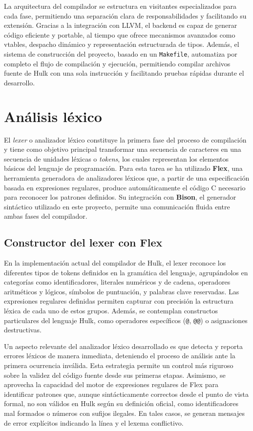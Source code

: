 \documentclass{llncs}
\begin{document}
	La arquitectura del compilador se estructura en visitantes especializados para cada fase, permitiendo una separación clara de responsabilidades y facilitando su extensión. Gracias a la integración con LLVM, el backend es capaz de generar código eficiente y portable, al tiempo que ofrece mecanismos avanzados como vtables, despacho dinámico y representación estructurada de tipos. Además, el sistema de construcción del proyecto, basado en un \texttt{Makefile}, automatiza por completo el flujo de compilación y ejecución, permitiendo compilar archivos fuente de Hulk con una sola instrucción y facilitando pruebas rápidas durante el desarrollo.



	\section{Análisis léxico}

	El \textit{lexer} o analizador léxico constituye la primera fase del proceso de compilación y tiene como objetivo principal transformar una secuencia de caracteres en una secuencia de unidades léxicas o \textit{tokens}, los cuales representan los elementos básicos del lenguaje de programación. Para esta tarea se ha utilizado \textbf{Flex}, una herramienta generadora de analizadores léxicos que, a partir de una especificación basada en expresiones regulares, produce automáticamente el código C necesario para reconocer los patrones definidos. Su integración con \textbf{Bison}, el generador sintáctico utilizado en este proyecto, permite una comunicación fluida entre ambas fases del compilador.

	\subsection{Constructor del lexer con Flex}

	En la implementación actual del compilador de Hulk, el lexer reconoce los diferentes tipos de tokens definidos en la gramática del lenguaje, agrupándolos en categorías como identificadores, literales numéricos y de cadena, operadores aritméticos y lógicos, símbolos de puntuación, y palabras clave reservadas. Las expresiones regulares definidas permiten capturar con precisión la estructura léxica de cada uno de estos grupos. Además, se contemplan constructos particulares del lenguaje Hulk, como operadores específicos (\texttt{@}, \texttt{@@}) o asignaciones destructivas.

	Un aspecto relevante del analizador léxico desarrollado es que detecta y reporta errores léxicos de manera inmediata, deteniendo el proceso de análisis ante la primera ocurrencia inválida. Esta estrategia permite un control más riguroso sobre la validez del código fuente desde sus primeras etapas. Asimismo, se aprovecha la capacidad del motor de expresiones regulares de Flex para identificar patrones que, aunque sintácticamente correctos desde el punto de vista formal, no son válidos en Hulk según su definición oficial, como identificadores mal formados o números con sufijos ilegales. En tales casos, se generan mensajes de error explícitos indicando la línea y el lexema conflictivo.
\end{document}

